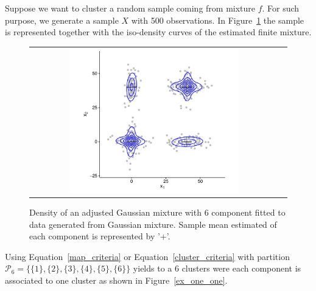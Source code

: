 \documentclass[10pt, a4paper]{article}
\begin{document}
\begin{spacing}{1.9}
Suppose we want to cluster a random sample coming from mixture $f$. For such purpose, we generate a sample $X$ with 500 observations. In  Figure~\ref{ex_mixture} the sample is represented together with the iso-density curves of the estimated finite mixture.

\begin{figure}[thbp]
\begin{center}
\begin{tabular}{cc}
  \includegraphics[width=0.7\textwidth]{figures/partition-example-mixture.pdf} \\
 \end{tabular}
 \caption{Density of an adjusted Gaussian mixture with 6 component fitted to data generated from Gaussian mixture. Sample mean estimated of each component is represented by '+'.}\label{ex_mixture}
\end{center}
\end{figure}

Using Equation~\ref{map_criteria} or Equation~\ref{cluster_criteria} with partition $\mathcal{P}_6 = \{ \{1\},\{2\}, \{3\}, \{4\}, \{5\}, \{6\} \}$ yields to a 6 clusters were each component is associated to one cluster as shown in Figure~\ref{ex_one_one}.


\end{spacing}
\end{document}

